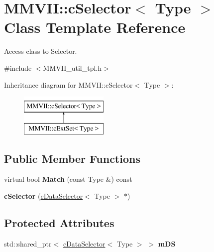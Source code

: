 \hypertarget{classMMVII_1_1cSelector}{}\section{M\+M\+V\+II\+:\+:c\+Selector$<$ Type $>$ Class Template Reference}
\label{classMMVII_1_1cSelector}


Access class to Selector.  




{\ttfamily \#include $<$M\+M\+V\+I\+I\+\_\+util\+\_\+tpl.\+h$>$}

Inheritance diagram for M\+M\+V\+II\+:\+:c\+Selector$<$ Type $>$\+:\begin{figure}[H]
\begin{center}
\leavevmode
\includegraphics[height=2.000000cm]{classMMVII_1_1cSelector}
\end{center}
\end{figure}
\subsection*{Public Member Functions}
\begin{DoxyCompactItemize}
\item 
virtual bool {\bfseries Match} (const Type \&) const \hypertarget{classMMVII_1_1cSelector_a51ff08ba5e03e2298dfc688b39b54ea6}{}\label{classMMVII_1_1cSelector_a51ff08ba5e03e2298dfc688b39b54ea6}

\item 
{\bfseries c\+Selector} (\hyperlink{classMMVII_1_1cDataSelector}{c\+Data\+Selector}$<$ Type $>$ $\ast$)\hypertarget{classMMVII_1_1cSelector_ac8819401d2aa9a52ca2bb3565cef56a0}{}\label{classMMVII_1_1cSelector_ac8819401d2aa9a52ca2bb3565cef56a0}

\end{DoxyCompactItemize}
\subsection*{Protected Attributes}
\begin{DoxyCompactItemize}
\item 
std\+::shared\+\_\+ptr$<$ \hyperlink{classMMVII_1_1cDataSelector}{c\+Data\+Selector}$<$ Type $>$ $>$ {\bfseries m\+DS}\hypertarget{classMMVII_1_1cSelector_a7d4255bb7cbf352504bb1cb9ddcac234}{}\label{classMMVII_1_1cSelector_a7d4255bb7cbf352504bb1cb9ddcac234}

\end{DoxyCompactItemize}


